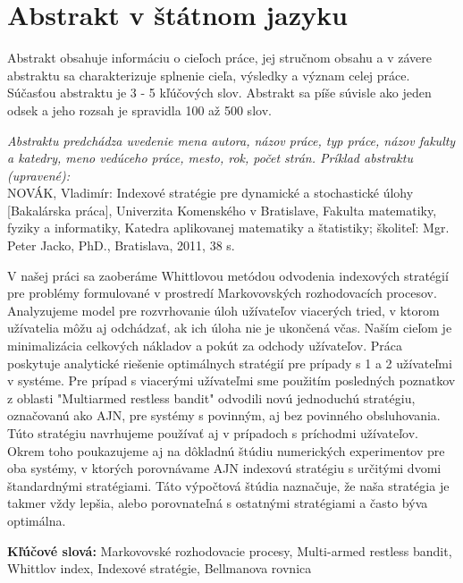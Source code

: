\thispagestyle{empty}
\section*{Abstrakt v štátnom jazyku}
Abstrakt obsahuje informáciu o cieľoch práce, jej stručnom obsahu a v závere abstraktu sa charakterizuje splnenie cieľa, výsledky a význam celej práce. Súčasťou abstraktu je 3 - 5 kľúčových slov. Abstrakt sa píše súvisle ako jeden odsek a jeho rozsah je spravidla 100 až 500 slov. 

{\it Abstraktu predchádza uvedenie mena autora, názov práce, typ práce, názov fakulty a katedry, meno vedúceho práce, mesto, rok, počet strán.
Príklad abstraktu (upravené): } \\
NOVÁK, Vladimír: Indexové stratégie pre dynamické a stochastické úlohy [Bakalárska práca], Univerzita Komenského v Bratislave, Fakulta matematiky, fyziky a informatiky, Katedra aplikovanej matematiky a štatistiky; školiteľ: Mgr. Peter Jacko, PhD., Bratislava, 2011,  38 s.

V našej práci sa zaoberáme Whittlovou metódou odvodenia indexových stratégií
pre problémy formulované v prostredí Markovovských rozhodovacích procesov. Analyzujeme model pre rozvrhovanie úloh užívateľov viacerých tried, v ktorom užívatelia môžu aj odchádzať, ak ich úloha nie je ukončená včas. Naším cieľom je minimalizácia celkových nákladov a pokút za odchody užívateľov. Práca poskytuje analytické riešenie optimálnych stratégií pre prípady s 1 a 2 užívateľmi v systéme. Pre prípad s viacerými užívateľmi sme použitím posledných poznatkov z oblasti "Multiarmed restless bandit" odvodili novú jednoduchú stratégiu, označovanú ako AJN,
pre systémy s povinným, aj bez povinného obsluhovania. Túto stratégiu navrhujeme
používať aj v prípadoch s príchodmi užívateľov. Okrem toho poukazujeme aj na
dôkladnú štúdiu numerických experimentov pre oba systémy, v ktorých porovnávame
AJN indexovú stratégiu s určitými dvomi štandardnými stratégiami. Táto výpočtová štúdia naznačuje, že naša stratégia je takmer vždy lepšia, alebo porovnateľná s ostatnými stratégiami a často býva optimálna.

\begin{flushleft}
  \textbf{Kľúčové slová:} Markovovské rozhodovacie procesy, Multi-armed restless bandit, Whittlov index, Indexové stratégie, Bellmanova rovnica
\end{flushleft}